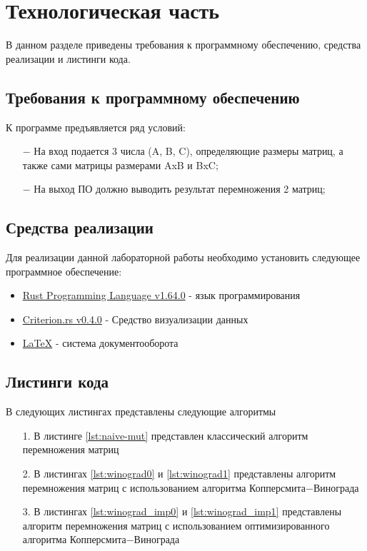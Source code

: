 \chapter{Технологическая часть}

В данном разделе приведены требования к программному обеспечению, средства реализации и листинги кода.

\section{Требования к программному обеспечению}
К программе предъявляется ряд условий:
\begin{itemize}
    \item[$-$] На вход подается 3 числа (A, B, C), определяющие размеры матриц, а также сами матрицы размерами AxB и BxC;
    \item[$-$] На выход ПО должно выводить результат перемножения 2 матриц;
\end{itemize}

\section{Средства реализации}
Для реализации данной лабораторной работы необходимо установить следующее программное обеспечение:
\begin{itemize}
    \item \href{https://www.rust-lang.org/}{Rust Programming Language v1.64.0} - язык программирования
    \item \href{https://github.com/bheisler/criterion.rs}{Criterion.rs v0.4.0} - Средство визуализации данных
    \item \href{https://www.latex-project.org/}{LaTeX} - система документооборота
\end{itemize}

\section{Листинги кода}
В следующих листингах представлены следующие алгоритмы
\begin{itemize}
    \item[1.] В листинге \ref{lst:naive-mut} представлен классический алгоритм перемножения матриц
    \item[2.] В листингах \ref{lst:winograd0} и \ref{lst:winograd1} представлены алгоритм перемножения матриц с использованием алгоритма Копперсмита$-$Винограда
    \item[3.] В листингах \ref{lst:winograd_imp0} и \ref{lst:winograd_imp1} представлены алгоритм перемножения матриц с использованием оптимизированного алгоритма Копперсмита$-$Винограда
\end{itemize}
\newpage

